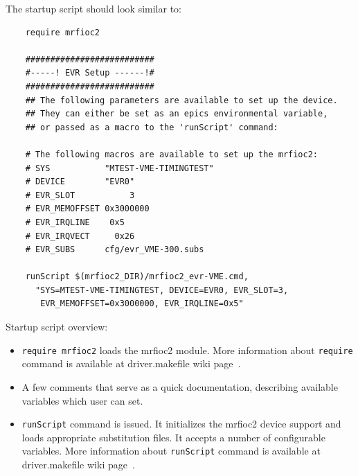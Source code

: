 \documentclass[12pt,a4paper]{article}
\begin{document}
\begin{enumerate}
	The startup script should look similar to:
\begin{verbatim}
	require mrfioc2
	
	##########################
	#-----! EVR Setup ------!#
	##########################
	## The following parameters are available to set up the device. 
	## They can either be set as an epics environmental variable, 
	## or passed as a macro to the 'runScript' command:
	
	# The following macros are available to set up the mrfioc2:
	# SYS           "MTEST-VME-TIMINGTEST"
	# DEVICE        "EVR0"		
	# EVR_SLOT		     3			
	# EVR_MEMOFFSET	0x3000000
	# EVR_IRQLINE 	 0x5		
	# EVR_IRQVECT	  0x26
	# EVR_SUBS      cfg/evr_VME-300.subs
	
	runScript $(mrfioc2_DIR)/mrfioc2_evr-VME.cmd, 
	  "SYS=MTEST-VME-TIMINGTEST, DEVICE=EVR0, EVR_SLOT=3,
	   EVR_MEMOFFSET=0x3000000, EVR_IRQLINE=0x5"
\end{verbatim}
Startup script overview:
\begin{itemize}
\item 
	\texttt{require mrfioc2} loads the mrfioc2 module. More information about \texttt{require} command is available at driver.makefile wiki page~\cite{driver.makefile}.
\item 
	A few comments that serve as a quick documentation, describing available variables which user can set.
\item 
	\texttt{runScript} command is issued. It initializes the mrfioc2 device support and loads appropriate substitution files. It accepts a number of configurable variables. More information about \texttt{runScript} command is available at driver.makefile wiki page~\cite{driver.makefile}.
\end{itemize}


\end{enumerate}
\end{document}

